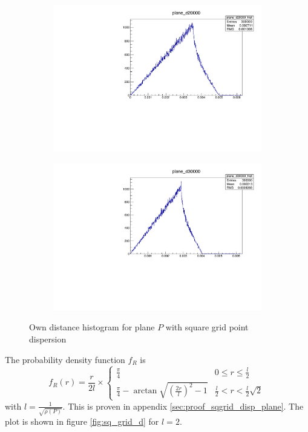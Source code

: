 \begin{figure}[H]
\centering
\hspace*{\fill}%
\begin{subfigure}{.4\textwidth}
	\includegraphics[width=\linewidth]{fig/plane_d20000.pdf}
\end{subfigure}%
\hfill{}%
\begin{subfigure}{.4\textwidth}
	\includegraphics[width=\linewidth]{fig/plane_d30000.pdf}
\end{subfigure}%
\hspace*{\fill}
\caption{Own distance histogram for plane $P$ with square grid point dispersion}
\label{fig:plane_cphist}
\end{figure}

The probability density function $f_R$ is
\begin{equation}
f_R(r) = \frac{r}{2 l} \times \begin{cases}
	\frac{\pi}{4} & 0 \leq r \leq \frac{l}{2} \\
	\frac{\pi}{4} - \arctan{\sqrt{\left( \frac{2r}{l} \right)^2 - 1}} & \frac{l}{2} < r < \frac{l}{2} \sqrt{2}
\end{cases}
\end{equation}
with $l = \frac{1}{\sqrt{\rho(P)}}$. This is proven in appendix \ref{sec:proof_sqgrid_disp_plane}. The plot is shown in figure \ref{fig:sq_grid_d} for $l = 2$.


